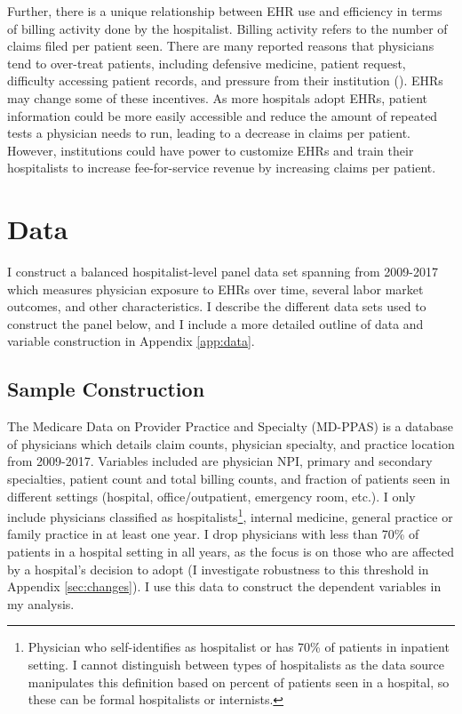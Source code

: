 \documentclass[12pt]{article}
\begin{document}
Further, there is a unique relationship between EHR use and efficiency in terms of billing activity done by the hospitalist. Billing activity refers to the number of claims filed per patient seen. There are many reported reasons that physicians tend to over-treat patients, including defensive medicine, patient request, difficulty accessing patient records, and pressure from their institution (\cite{lyu2017overtreatment}). EHRs may change some of these incentives. As more hospitals adopt EHRs, patient information could be more easily accessible and reduce the amount of repeated tests a physician needs to run, leading to a decrease in claims per patient. However, institutions could have power to customize EHRs and train their hospitalists to increase fee-for-service revenue by increasing claims per patient. 





\section{Data}\label{sec:data}

I construct a balanced hospitalist-level panel data set spanning from 2009-2017 which measures physician exposure to EHRs over time, several labor market outcomes, and other characteristics. I describe the different data sets used to construct the panel below, and I include a more detailed outline of data and variable construction in Appendix \ref{app:data}.

\subsection{Sample Construction}

The Medicare Data on Provider Practice and Specialty (MD-PPAS) is a database of physicians which details claim counts, physician specialty, and practice location from 2009-2017. Variables included are physician NPI, primary and secondary specialties, patient count and total billing counts, and fraction of patients seen in different settings (hospital, office/outpatient, emergency room, etc.). I only include physicians classified as hospitalists\footnote{Physician who self-identifies as hospitalist or has 70\% of patients in inpatient setting. I cannot distinguish between types of hospitalists as the data source manipulates this definition based on percent of patients seen in a hospital, so these can be formal hospitalists or internists.}, internal medicine, general practice or family practice in at least one year. I drop physicians with less than 70\% of patients in a hospital setting in all years, as the focus is on those who are affected by a hospital's decision to adopt (I investigate robustness to this threshold in Appendix \ref{sec:changes}). I use this data to construct the dependent variables in my analysis.  
\end{document}
